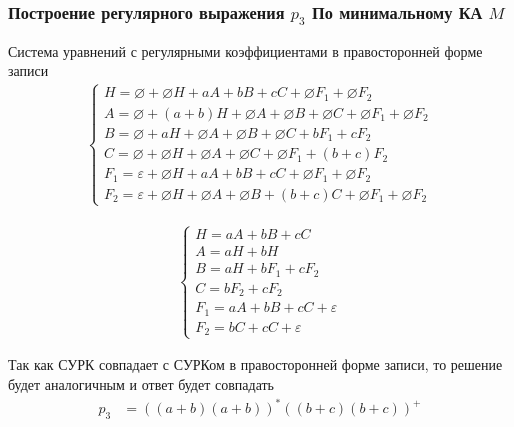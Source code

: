 \subsubsection{Построение регулярного выражения \(p_3\) По минимальному КА \(M\)}
Система уравнений с регулярными коэффициентами в правосторонней форме записи
\begin{align*}
  \left\{
  \begin{array}{l}
    H = \varnothing + \varnothing H + aA + bB + cC + \varnothing F_1 + \varnothing F_2 \\
    A = \varnothing + (a+b) H + \varnothing A + \varnothing B + \varnothing C + \varnothing F_1 + \varnothing F_2 \\
    B = \varnothing + aH + \varnothing A + \varnothing B + \varnothing C + b F_1 + c F_2 \\
    C = \varnothing + \varnothing H + \varnothing A + \varnothing C + \varnothing F_1 + (b+c) F_2 \\
    F_1 = \varepsilon + \varnothing H + a A + b B + c C + \varnothing F_1 + \varnothing F_2 \\
    F_2 = \varepsilon + \varnothing H + \varnothing A + \varnothing B + (b+c)C + \varnothing F_1 + \varnothing F_2
  \end{array}
  \right.
\end{align*}

\begin{align*}
	\left\{
	\begin{array}{l}
		H = aA + bB + cC                 \\
		A = aH + bH                      \\
		B = aH + bF_1 + cF_2             \\
		C = bF_2 + cF_2                  \\
		F_1 = aA + bB + cC + \varepsilon \\
		F_2 = bC + cC + \varepsilon
	\end{array}
	\right.
\end{align*}

Так как СУРК совпадает с СУРКом в правосторонней форме записи, то решение будет аналогичным и ответ будет совпадать
\begin{align*}
	p_3           & = ((a+b)(a+b))^*((b+c)(b+c))^+
\end{align*}
